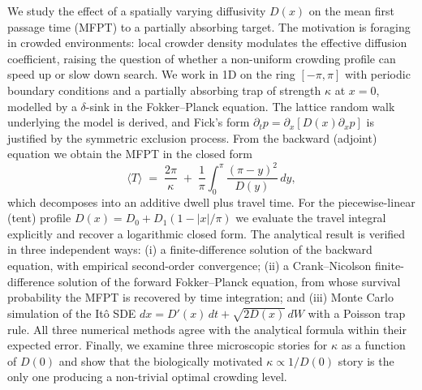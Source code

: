 We study the effect of a spatially varying diffusivity $D(x)$ on the mean first
passage time (MFPT) to a partially absorbing target.  The motivation is foraging in
crowded environments: local crowder density modulates the effective diffusion
coefficient, raising the question of whether a non-uniform crowding profile can
speed up or slow down search.  We work in 1D on the ring $[-\pi,\pi]$ with periodic
boundary conditions and a partially absorbing trap of strength $\kappa$ at $x=0$,
modelled by a $\delta$-sink in the Fokker--Planck equation.  The lattice random walk
underlying the model is derived, and Fick's form
$\partial_t p=\partial_x[D(x)\partial_x p]$ is justified by the symmetric exclusion
process.  From the backward (adjoint) equation we obtain the MFPT in the closed
form
\[
\langle T\rangle
\;=\;\frac{2\pi}{\kappa}\;+\;\frac{1}{\pi}\!\int_0^\pi\!\frac{(\pi-y)^2}{D(y)}\,dy,
\]
which decomposes into an additive dwell plus travel time.
For the piecewise-linear (tent) profile $D(x)=D_0+D_1(1-|x|/\pi)$ we evaluate the
travel integral explicitly and recover a logarithmic closed form.  The analytical
result is verified in three independent ways: (i) a finite-difference solution of
the backward equation, with empirical second-order convergence; (ii) a
Crank--Nicolson finite-difference solution of the forward Fokker--Planck equation,
from whose survival probability the MFPT is recovered by time integration; and
(iii) Monte Carlo simulation of the It\^o SDE $dx=D'(x)\,dt+\sqrt{2D(x)}\,dW$ with
a Poisson trap rule.  All three numerical methods agree with the analytical
formula within their expected error.  Finally, we examine three microscopic
stories for $\kappa$ as a function of $D(0)$ and show that the biologically
motivated $\kappa\propto 1/D(0)$ story is the only one producing a non-trivial
optimal crowding level.

